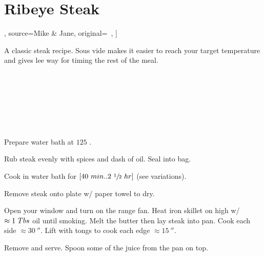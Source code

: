 \section[Ribeye Steak]{Ribeye Steak}

\begin{recipestats}[
        servings=2,
        preptime=10 \minute,
        bakingtime=[40~\minute..2\onehalf~\hour],
        source=Mike \& Jane,
        original=~\cite{anovaRibeye},
    ]
\end{recipestats}

\begin{recipeabstract}
    A classic steak recipe.
    Sous vide makes it easier to reach your target temperature and gives lee way for timing the rest of the meal.
\end{recipeabstract}

\begin{ingredientcolumns}
    \begin{ingredientblock}
        \\
        \\
        \\
        \\
    \end{ingredientblock}
    \begin{ingredientblock}[searing]
        \\
    \end{ingredientblock}
\end{ingredientcolumns}

\begin{preparation}
\item Prepare water bath at $125$ \Fahrenheit.

\item Rub steak evenly with spices and dash of oil.
    Seal into bag.

\item Cook in water bath for $[40~min .. 2~\sfrac{1}{2}~hr]$ (see variations).

\item Remove steak onto plate w/ paper towel to dry.

\item Open your window and turn on the range fan.
    Heat iron skillet on high w/ $\approx1~Tbs$ oil until smoking.
    Melt the butter then lay steak into pan.
    Cook each side $\approx 30~\second$.
    Lift with tongs to cook each edge $\approx 15~\second$.

\item Remove and serve.
    Spoon some of the juice from the pan on top.

\end{preparation}

